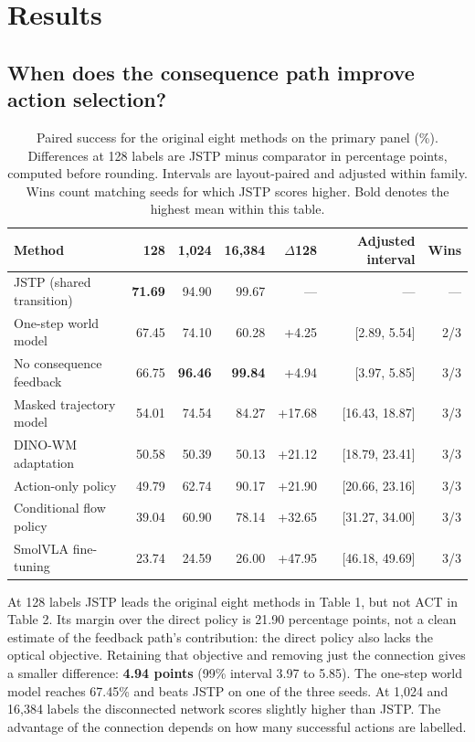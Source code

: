 \documentclass[11pt]{article}
\begin{document}
\FloatBarrier\section{Results}

\subsection{When does the consequence path improve action selection?}

\begin{table}[htbp]
\centering\small\setlength{\tabcolsep}{3.5pt}
\caption{Paired success for the original eight methods on the primary panel (\%). Differences at 128 labels are JSTP minus comparator in percentage points, computed before rounding. Intervals are layout-paired and adjusted within family. Wins count matching seeds for which JSTP scores higher. Bold denotes the highest mean within this table.}
\label{tab:1}
\begin{tabularx}{\linewidth}{@{}>{\raggedright\arraybackslash}Xrrrrrr@{}}
\toprule
\textbf{Method} & \textbf{128} & \textbf{1,024} & \textbf{16,384} & \textbf{\ensuremath{\Delta}128} & \textbf{Adjusted interval} & \textbf{Wins} \\
\midrule
JSTP (shared transition) & \textbf{71.69} & 94.90 & 99.67 & --- & --- & --- \\
One-step world model & 67.45 & 74.10 & 60.28 & +4.25 & [2.89, 5.54] & 2/3 \\
No consequence feedback & 66.75 & \textbf{96.46} & \textbf{99.84} & +4.94 & [3.97, 5.85] & 3/3 \\
Masked trajectory model & 54.01 & 74.54 & 84.27 & +17.68 & [16.43, 18.87] & 3/3 \\
DINO-WM adaptation & 50.58 & 50.39 & 50.13 & +21.12 & [18.79, 23.41] & 3/3 \\
Action-only policy & 49.79 & 62.74 & 90.17 & +21.90 & [20.66, 23.16] & 3/3 \\
Conditional flow policy & 39.04 & 60.90 & 78.14 & +32.65 & [31.27, 34.00] & 3/3 \\
SmolVLA fine-tuning & 23.74 & 24.59 & 26.00 & +47.95 & [46.18, 49.69] & 3/3 \\
\bottomrule
\end{tabularx}
\end{table}

At 128 labels JSTP leads the original eight methods in Table 1, but not ACT in Table 2. Its margin over the direct policy is 21.90 percentage points, not a clean estimate of the feedback path's contribution: the direct policy also lacks the optical objective. Retaining that objective and removing just the connection gives a smaller difference: \textbf{4.94 points} (99\% interval 3.97 to 5.85). The one-step world model reaches 67.45\% and beats JSTP on one of the three seeds. At 1,024 and 16,384 labels the disconnected network scores slightly higher than JSTP. The advantage of the connection depends on how many successful actions are labelled.
\end{document}
